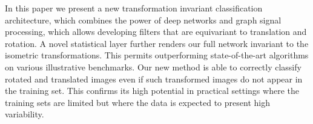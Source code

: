 \documentclass[10pt,journal,compsoc]{IEEEtran}
\begin{document}
	In this paper we present a new transformation invariant classification architecture, which combines the power of deep networks and graph signal processing, which allows developing filters that are equivariant to translation and rotation. A novel statistical layer further renders our full network invariant to the isometric transformations. This permits outperforming state-of-the-art algorithms on various illustrative benchmarks. Our new method is able to correctly classify rotated and translated images even if such transformed images do not appear in the training set. This confirms its high potential in practical settings where the training sets are limited but where the data is expected to present high variability.





\end{document}
